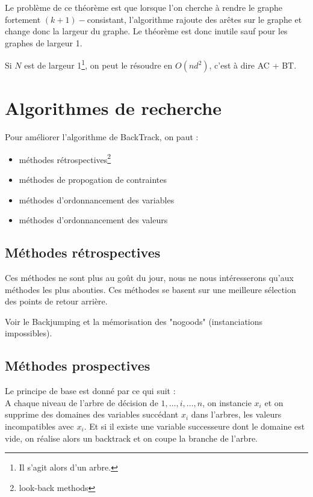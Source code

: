 \documentclass[a4paper,11pt]{thesis}
\begin{document}
Le problème de ce théorème est que lorsque l'on cherche à rendre le graphe fortement
$(k+1)-$consistant, l'algorithme rajoute des arêtes sur le graphe et change donc la largeur du
graphe. Le théorème est donc inutile sauf pour les graphes de largeur 1.

\begin{corol}
    Si $N$ est de largeur 1\footnote{Il s'agit alors d'un arbre.}, on peut le résoudre en $O(nd^2)$,
    c'est à dire AC + BT.
\end{corol}

\section{Algorithmes de recherche}

Pour améliorer l'algorithme de BackTrack, on paut :
\begin{itemize}
    \item méthodes rétrospectives\footnote{look-back methods}
    \item méthodes de propogation de contraintes
    \item méthodes d'ordonnancement des variables
    \item méthodes d'ordonnancement des valeurs
\end{itemize}

\subsection{Méthodes rétrospectives}

Ces méthodes ne sont plus au goût du jour, nous ne nous intéresserons qu'aux méthodes les plus
abouties. Ces méthodes se basent sur une meilleure sélection des points de retour arrière.

Voir le Backjumping et la mémorisation des "nogoods" (instanciations impossibles).

\subsection{Méthodes prospectives}

Le principe de base est donné par ce qui suit :\\
A chaque niveau de l'arbre de décision de $1, \dots, i, \dots, n$, on instancie $x_i$ et on supprime
des domaines des variables succédant $x_i$ dans l'arbres, les valeurs incompatibles avec $x_i$. Et
si il existe une variable successeure dont le domaine est vide, on réalise alors un backtrack et on
coupe la branche de l'arbre.
\end{document}

